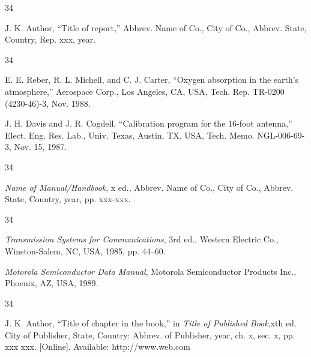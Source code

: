 \documentclass{IEEEjmw}
\begin{document}
\vspace*{-12pt}
\begin{thebibliography}{34}
\item[]\hskip-18pt
J. K. Author, ``Title of report,'' Abbrev. Name of Co., City of Co., Abbrev. State, Country, Rep. xxx, year.
\end{thebibliography}\vspace*{-12pt}

\vspace*{-12pt}
\begin{thebibliography}{34}
\setcounter{enumiv}{5}

\bibitem{} E. E. Reber, R. L. Michell, and C. J. Carter, ``Oxygen absorption in the earth's atmosphere,'' Aerospace Corp., Los Angeles, CA, USA, Tech. Rep. TR-0200 (4230-46)-3, Nov. 1988.

\bibitem{} J. H. Davis and J. R. Cogdell, ``Calibration program for the 16-foot antenna,'' Elect. Eng. Res. Lab., Univ. Texas, Austin, TX, USA, Tech. Memo. NGL-006-69-3, Nov. 15, 1987.
\end{thebibliography}

\vspace*{-12pt}
\begin{thebibliography}{34}
\item[]\hskip-18pt
{\em Name of Manual/Handbook}, x ed., Abbrev. Name of Co., City of Co., Abbrev. State, Country, year, pp. xxx-xxx.
\end{thebibliography}\vspace*{-12pt}

\vspace*{-12pt}

\begin{thebibliography}{34}
\setcounter{enumiv}{7}

\bibitem{} {\em Transmission Systems for Communications}, 3rd ed., Western Electric Co., Winston-Salem, NC, USA, 1985, pp. 44--60.

\bibitem{} {\em Motorola Semiconductor Data Manual}, Motorola Semiconductor Products Inc., Phoenix, AZ, USA, 1989.
\end{thebibliography}

\vspace*{-12pt}
\begin{thebibliography}{34}
\item[]\hskip-18pt
J. K. Author, ``Title of chapter in the book,'' in {\em Title of Published Book},\break xth ed. City of Publisher, State, Country: Abbrev. of Publisher, year, ch. x, sec. x, pp. xxx xxx. [Online]. Available: http://www.web.com 
\end{thebibliography}\vspace*{-12pt}
\end{document}
